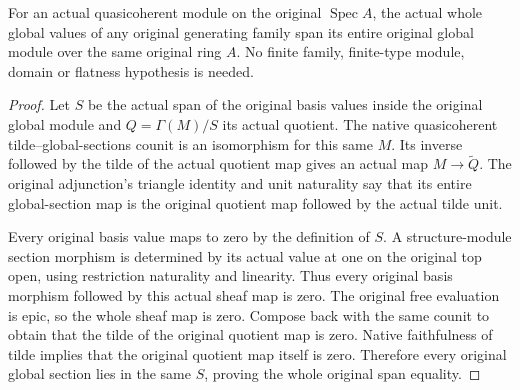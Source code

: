 \begin{lemma}
\leanok
\label{lem:kn-nadel-nef-big-affine-generator-span}
For an actual quasicoherent module on the original $\operatorname{Spec}A$,
the actual whole global values of any original generating family span its
entire original global module over the same original ring $A$. No finite
family, finite-type module, domain or flatness hypothesis is needed.
\end{lemma}
\begin{proof}
Let $S$ be the actual span of the original basis values inside the original
global module and $Q=\Gamma(M)/S$ its actual quotient. The native
quasicoherent tilde--global-sections counit is an isomorphism for this
same $M$. Its inverse followed by the tilde of the actual quotient map
gives an actual map $M\to\widetilde Q$. The original adjunction's triangle
identity and unit naturality say that its entire global-section map is
the original quotient map followed by the actual tilde unit.

Every original basis value maps to zero by the definition of $S$. A
structure-module section morphism is determined by its actual value at
one on the original top open, using restriction naturality and linearity.
Thus every original basis morphism followed by this actual sheaf map is
zero. The original free evaluation is epic, so the whole sheaf map is
zero. Compose back with the same counit to obtain that the tilde of the
original quotient map is zero. Native faithfulness of tilde implies that
the original quotient map itself is zero. Therefore every original global
section lies in the same $S$, proving the whole original span equality.
\end{proof}

